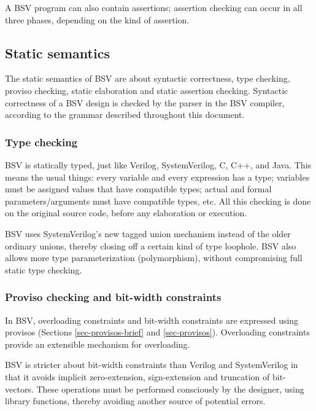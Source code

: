 \documentclass[twoside,letterpaper]{article}
\newcommand{\BSV}{BSV}
\newcommand{\SV}{SystemVerilog}
\newcommand{\V}{Verilog}
\begin{document}
A {\BSV} program can also contain assertions; assertion checking can
occur in all three phases, depending on the kind of assertion.


\subsection{Static semantics}

\label{sec-static-semantics}

The static semantics of {\BSV} are about syntactic correctness, type
checking, proviso checking, static elaboration and static assertion
checking.  Syntactic correctness of a {\BSV} design is checked by the
parser in the {\BSV} compiler, according to the grammar described
throughout this document.


\subsubsection{Type checking}

{\BSV} is statically typed, just like {\V}, {\SV}, C, C++, and Java.
This means the usual things: every variable and every expression has a
type; variables must be assigned values that have compatible types;
actual and formal parameters/arguments must have compatible types,
etc.  All this checking is done on the original source code, before
any elaboration or execution.

{\BSV} uses {\SV}'s new tagged union mechanism instead of the older
ordinary unions, thereby closing off a certain kind of type loophole.
{\BSV} also allows more type parameterization (polymorphism), without
compromising full static type checking.


\subsubsection{Proviso checking and bit-width constraints}

In {\BSV}, overloading constraints and bit-width constraints are
expressed using provisos (Sections \ref{sec-provisos-brief} and
\ref{sec-provisos}).  Overloading constraints provide an extensible
mechanism for overloading.

{\BSV} is stricter about bit-width constraints than {\V} and {\SV} in
that it avoids implicit zero-extension, sign-extension and truncation
of bit-vectors.  These operations must be performed consciously by the
designer, using library functions, thereby avoiding another source of
potential errors.
\end{document}

